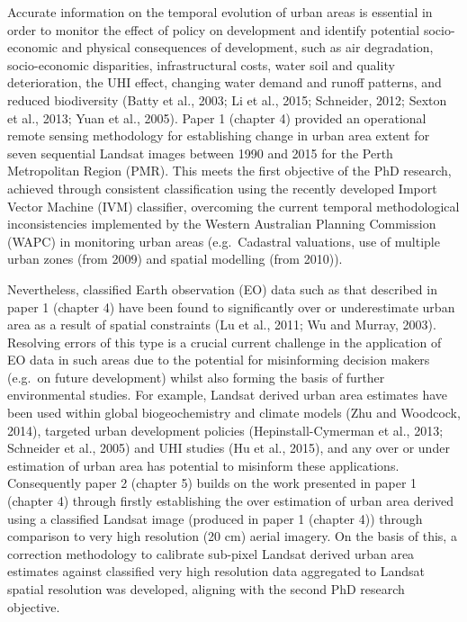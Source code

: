 \documentclass[]{book}
\begin{document}
Accurate information on the temporal evolution of urban areas is
essential in order to monitor the effect of policy on development and
identify potential socio-economic and physical consequences of
development, such as air degradation, socio-economic disparities,
infrastructural costs, water soil and quality deterioration, the UHI
effect, changing water demand and runoff patterns, and reduced
biodiversity (Batty et al., 2003; Li et al., 2015; Schneider, 2012;
Sexton et al., 2013; Yuan et al., 2005). Paper 1 (chapter 4) provided an
operational remote sensing methodology for establishing change in urban
area extent for seven sequential Landsat images between 1990 and 2015
for the Perth Metropolitan Region (PMR). This meets the first objective
of the PhD research, achieved through consistent classification using
the recently developed Import Vector Machine (IVM) classifier,
overcoming the current temporal methodological inconsistencies
implemented by the Western Australian Planning Commission (WAPC) in
monitoring urban areas (e.g.~Cadastral valuations, use of multiple urban
zones (from 2009) and spatial modelling (from 2010)).

Nevertheless, classified Earth observation (EO) data such as that
described in paper 1 (chapter 4) have been found to significantly over
or underestimate urban area as a result of spatial constraints (Lu et
al., 2011; Wu and Murray, 2003). Resolving errors of this type is a
crucial current challenge in the application of EO data in such areas
due to the potential for misinforming decision makers (e.g.~on future
development) whilst also forming the basis of further environmental
studies. For example, Landsat derived urban area estimates have been
used within global biogeochemistry and climate models (Zhu and Woodcock,
2014), targeted urban development policies (Hepinstall-Cymerman et al.,
2013; Schneider et al., 2005) and UHI studies (Hu et al., 2015), and any
over or under estimation of urban area has potential to misinform these
applications. Consequently paper 2 (chapter 5) builds on the work
presented in paper 1 (chapter 4) through firstly establishing the over
estimation of urban area derived using a classified Landsat image
(produced in paper 1 (chapter 4)) through comparison to very high
resolution (20 cm) aerial imagery. On the basis of this, a correction
methodology to calibrate sub-pixel Landsat derived urban area estimates
against classified very high resolution data aggregated to Landsat
spatial resolution was developed, aligning with the second PhD research
objective.
\end{document}
